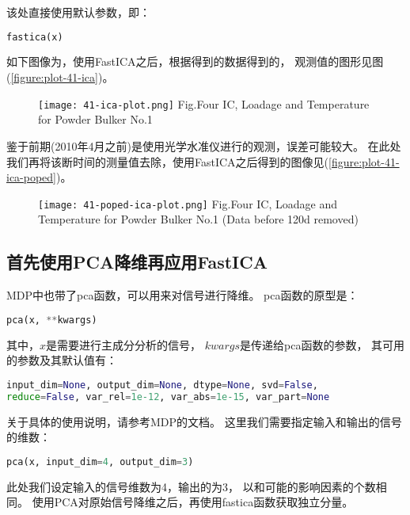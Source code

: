 该处直接使用默认参数，即：
\begin{lstlisting}[language=Python, basicstyle=\ttfamily]
fastica(x)
\end{lstlisting}
如下图像为，使用FastICA之后，根据得到的数据得到的，
观测值的图形见图(\ref{figure:plot-41-ica})。

\begin{figure}[!htbp]
   \centering
   \texttt{[image: 41-ica-plot.png]}
			{Fig.}{Four IC, Loadage and Temperature for Powder Bulker No.1}
\end{figure}

鉴于前期(2010年4月之前)是使用光学水准仪进行的观测，误差可能较大。
在此处我们再将该断时间的测量值去除，使用FastICA之后得到的图像见(\ref{figure:plot-41-ica-poped})。
\begin{figure}[!htbp]
   \centering
   \texttt{[image: 41-poped-ica-plot.png]}
			{Fig.}{Four IC, Loadage and Temperature for Powder Bulker No.1 (Data before 120d removed)}
\end{figure}


\subsection{首先使用PCA降维再应用FastICA}
MDP中也带了pca函数，可以用来对信号进行降维。
pca函数的原型是：
\begin{lstlisting}[language=Python, basicstyle=\ttfamily]
pca(x, **kwargs)
\end{lstlisting}
其中，$x$是需要进行主成分分析的信号，
$kwargs$是传递给pca函数的参数，
其可用的参数及其默认值有：
\begin{lstlisting}[language=Python, basicstyle=\ttfamily]
input_dim=None, output_dim=None, dtype=None, svd=False, 
reduce=False, var_rel=1e-12, var_abs=1e-15, var_part=None
\end{lstlisting}
关于具体的使用说明，请参考MDP的文档。
这里我们需要指定输入和输出的信号的维数：
\begin{lstlisting}[language=Python, basicstyle=\ttfamily]
pca(x, input_dim=4, output_dim=3)
\end{lstlisting}
此处我们设定输入的信号维数为4，输出的为3，
以和可能的影响因素的个数相同。
使用PCA对原始信号降维之后，再使用fastica函数获取独立分量。

